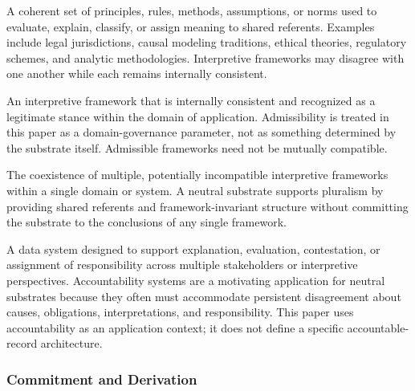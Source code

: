 \begin{description}[style=nextline,leftmargin=1.5cm]

\item[Interpretive Framework]
A coherent set of principles, rules, methods, assumptions,
or norms used to evaluate, explain, classify,
or assign meaning to shared referents.
Examples include legal jurisdictions, causal modeling traditions,
ethical theories, regulatory schemes, and analytic methodologies.
Interpretive frameworks may disagree with one another
while each remains internally consistent.

\item[Admissible Framework]
An interpretive framework that is internally consistent
and recognized as a legitimate stance
within the domain of application.
Admissibility is treated in this paper
as a domain-governance parameter,
not as something determined by the substrate itself.
Admissible frameworks need not be mutually compatible.

\item[Pluralism]
The coexistence of multiple,
potentially incompatible interpretive frameworks
within a single domain or system.
A neutral substrate supports pluralism
by providing shared referents and framework-invariant structure
without committing the substrate to the conclusions
of any single framework.

\item[Accountability System]
A data system designed to support explanation,
evaluation, contestation, or assignment of responsibility
across multiple stakeholders or interpretive perspectives.
Accountability systems are a motivating application
for neutral substrates because they often must accommodate
persistent disagreement about causes, obligations,
interpretations, and responsibility.
This paper uses accountability as an application context;
it does not define a specific accountable-record architecture.

\end{description}

\subsubsection*{Commitment and Derivation}

